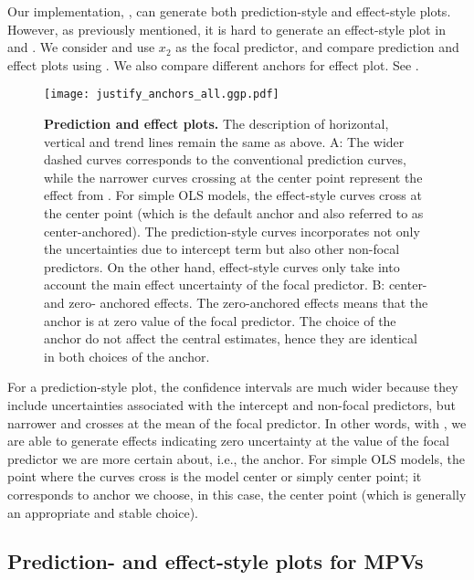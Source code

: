 Our implementation, , can generate both prediction-style and effect-style plots. However, as previously mentioned, it is hard to generate an effect-style plot in  and . We consider  and use $x_2$ as the focal predictor, and compare prediction and effect plots using . We also compare different anchors for effect plot. See . 
%
\begin{figure}
\begin{center}
\texttt{[image: justify\_anchors\_all.ggp.pdf]}
\end{center}
\caption{{\bf Prediction and effect plots.} The description of horizontal, vertical and trend lines remain the same as above. A: The wider dashed curves corresponds to the conventional prediction curves, while the narrower curves crossing at the center point represent the effect from . For simple OLS models, the effect-style curves cross at the center point (which is the default anchor and also referred to as center-anchored). The prediction-style curves incorporates not only the uncertainties due to intercept term but also other non-focal predictors. On the other hand, effect-style curves only take into account the main effect uncertainty of the focal predictor. B: center- and zero- anchored effects. The zero-anchored effects means that the anchor is at zero value of the focal predictor. The choice of the anchor do not affect the central estimates, hence they are identical in both choices of the anchor.}
\label{fig:justify_ci_plots}
\end{figure}
%
For a prediction-style plot, the confidence intervals are much wider because they include uncertainties associated with the intercept and non-focal predictors, but narrower and crosses at the mean of the focal predictor. In other words, with , we are able to generate effects indicating zero uncertainty at the value of the focal predictor we are more certain about, i.e., the anchor. For simple OLS models, the point where the curves cross is the model center or simply center point; it corresponds to anchor we choose, in this case, the center point (which is generally an appropriate and stable choice). 

\subsection{Prediction- and effect-style plots for MPVs}

